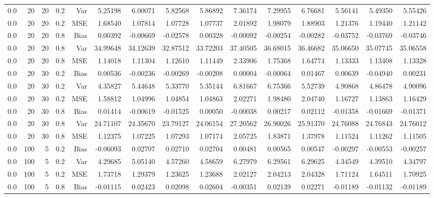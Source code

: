 \begin{table}[!htbp]
\begin{tabular}{lrrrrrrrrrrrrrr}
0.0 &  20 & 20 & 0.2 & Var & 5.25198 & 6.00071 & 5.82568 & 5.86892 & 7.36174 & 7.29955 & 6.76681 & 5.56141 & 5.49350 & 5.55426 \\
0.0 &  20 & 20 & 0.2 & MSE & 1.68540 & 1.07814 & 1.07728 & 1.07737 & 2.01892 & 1.98079 & 1.88903 & 1.21376 & 1.19440 & 1.21142 \\
0.0 &  20 & 20 & 0.8 & Bias & 0.00392 & -0.00669 & -0.02578 & 0.00328 & -0.00092 & -0.00254 & -0.00282 & -0.03752 & -0.03769 & -0.03746 \\
0.0 &  20 & 20 & 0.8 & Var & 34.99648 & 34.12639 & 32.87512 & 33.72203 & 37.40505 & 36.68015 & 36.46682 & 35.06650 & 35.07745 & 35.06558 \\
0.0 &  20 & 20 & 0.8 & MSE & 1.14018 & 1.11304 & 1.12610 & 1.11449 & 2.33906 & 1.75368 & 1.64774 & 1.13333 & 1.13408 & 1.13328 \\
0.0 &  20 & 30 & 0.2 & Bias & 0.00536 & -0.00236 & -0.00269 & -0.00208 & 0.00004 & -0.00064 & 0.01467 & 0.00639 & -0.04940 & 0.00231 \\
0.0 &  20 & 30 & 0.2 & Var & 4.35827 & 5.44648 & 5.33770 & 5.35144 & 6.81667 & 6.75366 & 5.52739 & 4.90868 & 4.86478 & 4.90096 \\
0.0 &  20 & 30 & 0.2 & MSE & 1.58812 & 1.04996 & 1.04854 & 1.04863 & 2.02271 & 1.98480 & 2.04740 & 1.16727 & 1.13863 & 1.16429 \\
0.0 &  20 & 30 & 0.8 & Bias & 0.01414 & -0.00619 & -0.01525 & 0.00050 & -0.00038 & 0.00217 & 0.02112 & -0.01358 & -0.01669 & -0.01371 \\
0.0 &  20 & 30 & 0.8 & Var & 24.71107 & 24.35670 & 23.79127 & 24.06154 & 27.20562 & 26.90026 & 25.91370 & 24.76088 & 24.76843 & 24.76012 \\
0.0 &  20 & 30 & 0.8 & MSE & 1.12375 & 1.07225 & 1.07293 & 1.07174 & 2.05725 & 1.83871 & 1.37978 & 1.11524 & 1.11262 & 1.11505 \\
0.0 & 100 &  5 & 0.2 & Bias & -0.06093 & 0.02707 & 0.02710 & 0.02704 & 0.00481 & 0.00565 & 0.00547 & -0.00297 & -0.00553 & -0.00257 \\
0.0 & 100 &  5 & 0.2 & Var & 4.29685 & 5.05140 & 4.57260 & 4.58659 & 6.27979 & 6.29561 & 6.29625 & 4.34549 & 4.39510 & 4.34797 \\
0.0 & 100 &  5 & 0.2 & MSE & 1.73718 & 1.29379 & 1.23625 & 1.23688 & 2.02127 & 2.04213 & 2.04328 & 1.71124 & 1.64511 & 1.70925 \\
0.0 & 100 &  5 & 0.8 & Bias & -0.01115 & 0.02423 & 0.02098 & 0.02604 & -0.00351 & 0.02139 & 0.02271 & -0.01189 & -0.01132 & -0.01189 \\

\end{tabular}
\end{table}
